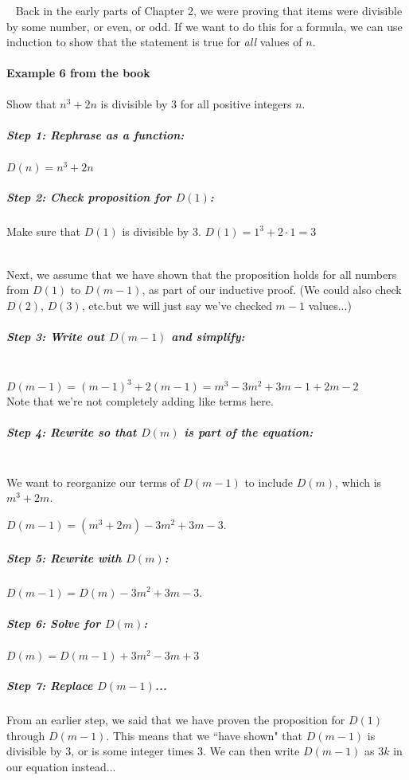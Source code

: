 \documentclass[a4paper,12pt]{book}
\begin{document}
        \begin{intro}{\ }
            \small 
            Back in the early parts of Chapter 2, we were proving that
            items were divisible by some number, or even, or odd.
            If we want to do this for a formula, we can use induction
            to show that the statement is true for \textit{all}
            values of $n$.

            \paragraph{Example 6 from the book}
                Show that $n^{3} + 2n$ is divisible by 3 for all positive
                integers $n$.

            \subparagraph{Step 1: Rephrase as a function:}
                $D(n) = n^{3} + 2n$

            \subparagraph{Step 2: Check proposition for $D(1)$:}
                Make sure that $D(1)$ is divisible by 3. \tab
                $D(1) = 1^{3} + 2 \cdot 1 = 3$ \checkmark{}

            ~\\
            Next, we assume that we have shown that the proposition holds
            for all numbers from $D(1)$ to $D(m-1)$, as part of our inductive
            proof. (We could also check $D(2)$, $D(3)$, etc.but we will just say
            we've checked $m-1$ values...)

            \subparagraph{Step 3: Write out $D(m-1)$ and simplify:} ~\\            
                $D(m-1) = (m-1)^{3} + 2(m-1) = m^{3} - 3m^{2} + 3m - 1 + 2m - 2$ \\
                Note that we're not completely adding like terms here.

            \subparagraph{Step 4: Rewrite so that $D(m)$ is part of the equation:} ~\\
                We want to reorganize our terms of $D(m-1)$ to include $D(m)$, which is
                $m^{3} + 2m$.

                $D(m-1) = (m^{3} + 2m) - 3m^{2} + 3m - 3$.

            \subparagraph{Step 5: Rewrite with $D(m)$:}
                $D(m-1) = D(m) - 3m^{2} + 3m - 3$.

            \subparagraph{Step 6: Solve for $D(m)$:}
                $D(m) = D(m-1) + 3m^{2} - 3m + 3$

            \subparagraph{Step 7: Replace $D(m-1)$...}
                From an earlier step, we said that we have proven
                the proposition for $D(1)$ through $D(m-1)$. This means
                that we ``have shown" that $D(m-1)$ is divisible by 3, or
                is some integer times 3. We can then write $D(m-1)$ as
                $3k$ in our equation instead...


\end{intro}
\end{document}
